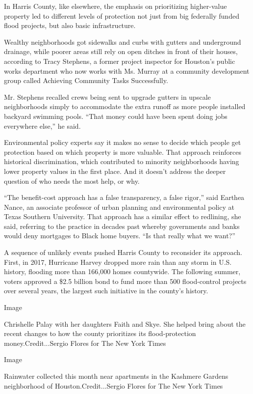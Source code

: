 In Harris County, like elsewhere, the emphasis on prioritizing
higher-value property led to different levels of protection not just
from big federally funded flood projects, but also basic infrastructure.

Wealthy neighborhoods got sidewalks and curbs with gutters and
underground drainage, while poorer areas still rely on open ditches in
front of their houses, according to Tracy Stephens, a former project
inspector for Houston's public works department who now works with Ms.
Murray at a community development group called Achieving Community Tasks
Successfully.

Mr. Stephens recalled crews being sent to upgrade gutters in upscale
neighborhoods simply to accommodate the extra runoff as more people
installed backyard swimming pools. ``That money could have been spent
doing jobs everywhere else,'' he said.

Environmental policy experts say it makes no sense to decide which
people get protection based on which property is more valuable. That
approach reinforces historical discrimination, which contributed to
minority neighborhoods having lower property values in the first place.
And it doesn't address the deeper question of who needs the most help,
or why.

``The benefit-cost approach has a false transparency, a false rigor,''
said Earthea Nance, an associate professor of urban planning and
environmental policy at Texas Southern University. That approach has a
similar effect to redlining, she said, referring to the practice in
decades past whereby governments and banks would deny mortgages to Black
home buyers. ``Is that really what we want?''

A sequence of unlikely events pushed Harris County to reconsider its
approach. First, in 2017, Hurricane Harvey dropped more rain than any
storm in U.S. history, flooding more than 166,000 homes countywide. The
following summer, voters approved a \$2.5 billion bond to fund more than
500 flood-control projects over several years, the largest such
initiative in the county's history.

Image

Chrishelle Palay with her daughters Faith and Skye. She helped bring
about the recent changes to how the county prioritizes its
flood-protection money.Credit...Sergio Flores for The New York Times

Image

Rainwater collected this month near apartments in the Kashmere Gardens
neighborhood of Houston.Credit...Sergio Flores for The New York Times

